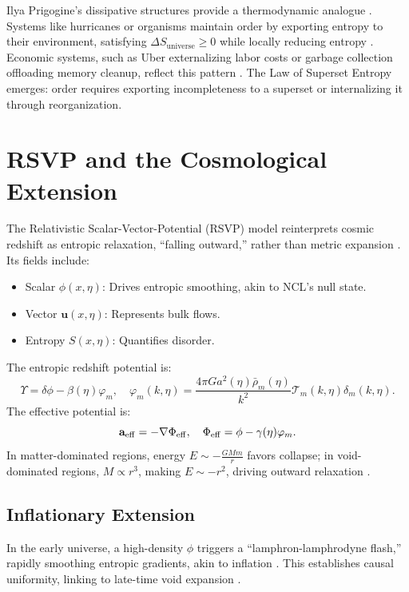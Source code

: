 \documentclass{article}
\begin{document}
Ilya Prigogine's dissipative structures provide a thermodynamic analogue \citep{prigogine1984}. Systems like hurricanes or organisms maintain order by exporting entropy to their environment, satisfying \(\Delta S_{\text{universe}} \geq 0\) while locally reducing entropy \citep{nicolis1977}. Economic systems, such as Uber externalizing labor costs or garbage collection offloading memory cleanup, reflect this pattern \citep{schneider2005}. The Law of Superset Entropy emerges: order requires exporting incompleteness to a superset or internalizing it through reorganization.

\section{RSVP and the Cosmological Extension}
\label{sec:rsvp}
The Relativistic Scalar-Vector-Potential (RSVP) model reinterprets cosmic redshift as entropic relaxation, ``falling outward,'' rather than metric expansion \citep{whittle2015}. Its fields include:
\begin{itemize}
    \item Scalar \(\phi(x,\eta)\): Drives entropic smoothing, akin to NCL's null state.
    \item Vector \(\mathbf{u}(x,\eta)\): Represents bulk flows.
    \item Entropy \(S(x,\eta)\): Quantifies disorder.
\end{itemize}

The entropic redshift potential is:
\[
\Upsilon = \delta\phi - \beta(\eta)\varphi_m, \quad \varphi_m(k,\eta) = \frac{4\pi G a^2(\eta) \bar{\rho}_m(\eta)}{k^2} \mathcal{T}_m(k,\eta) \delta_m(k,\eta).
\]
The effective potential is:
\[
\mathbf{a}_{\rm eff} = -\nabla \Phi_{\rm eff}, \quad \Phi_{\rm eff} = \phi - \gamma(\eta) \varphi_m.
\]
In matter-dominated regions, energy \( E \sim -\frac{G M m}{r} \) favors collapse; in void-dominated regions, \( M \propto r^3 \), making \( E \sim -r^2 \), driving outward relaxation \citep{whittle2015}.

\subsection{Inflationary Extension}
In the early universe, a high-density \(\phi\) triggers a ``lamphron-lamphrodyne flash,'' rapidly smoothing entropic gradients, akin to inflation \citep{whittle2015}. This establishes causal uniformity, linking to late-time void expansion \citep{desitter1917}.
\end{document}
